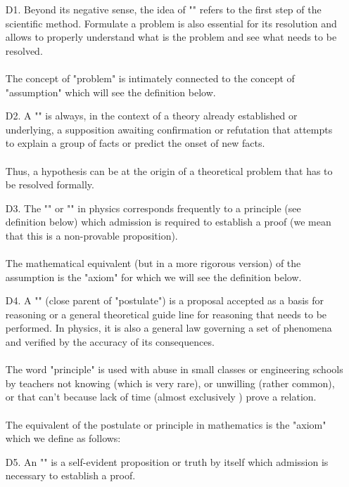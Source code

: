 \begin{itemize}
	\item[D1.] Beyond its negative sense, the idea of "" refers to the first step of the scientific method. Formulate a problem is also essential for its resolution and allows to properly understand what is the problem and see what needs to be resolved. \\\\
	The concept of "problem" is intimately connected to the concept of "assumption" which will see the definition below. 

	\item[D2.] A "" is always, in the context of a theory already established or underlying, a supposition awaiting confirmation or refutation that attempts to explain a group of facts or predict the onset of new facts.\\\\
	Thus, a hypothesis can be at the origin of a theoretical problem that has to be resolved formally. 

	\item[D3.] The "" or  "" in physics corresponds frequently to a principle (see definition below) which admission is required to establish a proof (we mean that this is a non-provable proposition).\\\\
	The mathematical equivalent (but in a more rigorous version) of the assumption is the "axiom" for which we will see the definition below. 

	\item[D4.] A "" (close parent of "postulate") is a proposal accepted as a basis for reasoning or a general theoretical guide line for reasoning that needs to be performed. In physics, it is also a general law governing a set of phenomena and verified by the accuracy of its consequences. \\\\
The word "principle" is used with abuse in small classes or engineering schools by teachers not knowing (which is very rare), or unwilling (rather common), or that can't because lack of time (almost exclusively ) prove a relation.\\\\
The equivalent of the postulate or principle in mathematics is the "axiom" which we define as follows: 

	\item[D5.] An "" is a self-evident proposition or truth by itself which admission is necessary to establish a proof. 
\end{itemize}

